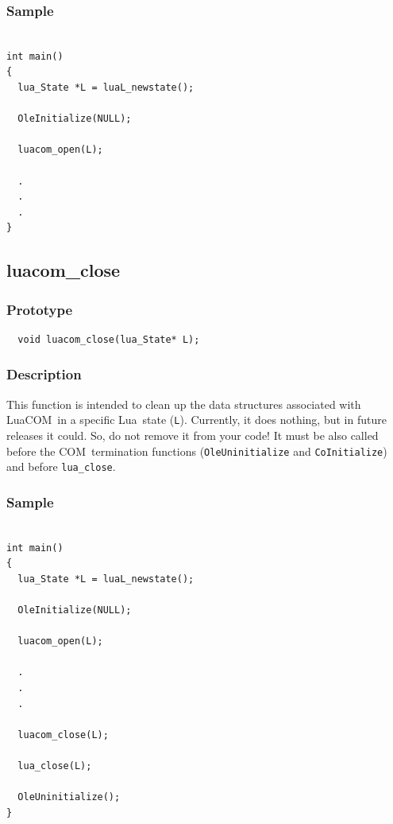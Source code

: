 \documentclass[11pt,a4paper,english]{report}
\newcommand{\ident}[1]{\mbox{\texttt{#1}}}
\newcommand{\techname}[1]{\mbox{#1}}
\newcommand{\lua}{\techname{Lua}}
\newcommand{\com}{\techname{COM}}
\newcommand{\luacom}{\techname{LuaCOM}}
\begin{document}
\subsubsection*{Sample}

\begin{verbatim}

int main()
{
  lua_State *L = luaL_newstate();

  OleInitialize(NULL);

  luacom_open(L);

  .
  .
  .
}

\end{verbatim}




\subsection*{luacom\_close}

\subsubsection*{Prototype}

\begin{verbatim}
  void luacom_close(lua_State* L);
\end{verbatim}

\subsubsection*{Description}
This function is intended to clean up the data structures associated
with \luacom\ in a specific \lua\ state (\ident{L}). Currently, it does nothing,
but in future releases it could. So, do not remove it from your code!
It must be also called before the \com\ termination functions
(\ident{OleUninitialize} and \ident{CoInitialize}) and before
\ident{lua\_close}.


\subsubsection*{Sample}

\begin{verbatim}

int main()
{
  lua_State *L = luaL_newstate();

  OleInitialize(NULL);

  luacom_open(L);

  .
  .
  .

  luacom_close(L);

  lua_close(L);

  OleUninitialize();
}

\end{verbatim}
\end{document}
